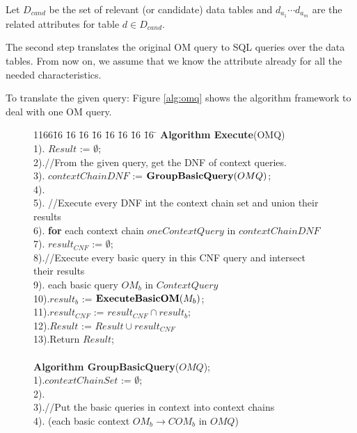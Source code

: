 Let $D_{cand}$ be the set of relevant (or candidate) data tables and $d_{a_1} \cdots d_{a_m}$
are the related attributes for table $d\in D_{cand}$.


The second step translates the original OM query to SQL queries over the data tables.
From now on, we assume that we know the attribute already for all the needed characteristics.

To translate the given query:
Figure \ref{alg:omq} shows the algorithm framework to deal with one OM query.

\begin{figure}[htb]
\begin{scriptsize}
\begin{tabbing}
1166\= 16 \= 16 \= 16 \= 16 \= 16 \= 16 \= 16 \= 16 \= \kill
{\bf Algorithm Execute}(OMQ)\\
1).\> $Result$ := $\emptyset$;\\
2).\>//From the given query, get the DNF of context queries.\\
3).\> $contextChainDNF$ := ${\bf GroupBasicQuery}(OMQ)$;\\
4).\> \\
5).\> //Execute every DNF int the context chain set and union their results\\
6).\> {\bf for} each context chain $oneContextQuery$ in $contextChainDNF$\\
7).\>\> $result_{CNF}$ := $\emptyset$;\\
8).\>\>//Execute every basic query in this CNF query and intersect their results\\
9).\> each basic query $OM_{b}$ in $ContextQuery$\\
10).\>\>\>$result_{b}$ := ${\bf ExecuteBasicOM}(M_{b})$;\\
11).\>\>\>$result_{CNF}$ := $result_{CNF} \cap result_{b}$;\\
12).\>\>$Result$ := $Result\cup result_{CNF}$\\
13).\>Return $Result$;\\
\\
{\bf Algorithm GroupBasicQuery}($OMQ$);\\
1).\>$contextChainSet$ := $\emptyset$;\\
2).\\
3).\>//Put the basic queries in context into context chains\\
4). (each basic context $OM_{b}\rightarrow COM_{b}$ in $OMQ$)\\

\end{tabbing}
\end{scriptsize}
\end{figure}
